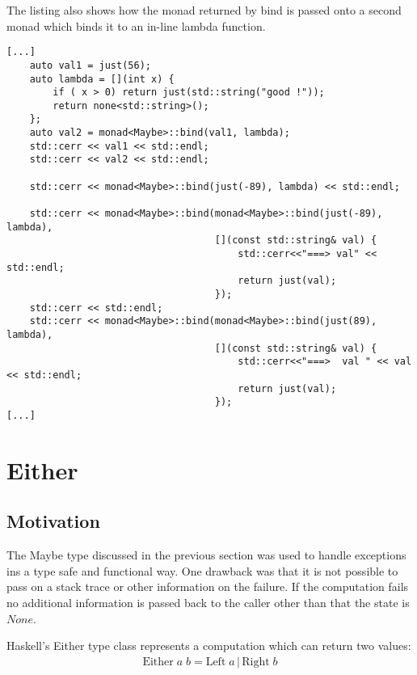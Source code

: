 \documentclass[12pt,fleqn]{article}
\begin{document}
The listing also shows how the monad returned by bind is passed onto a second monad which binds it to an in-line lambda function.

%
%
\begin{minipage}{\linewidth}
\begin{lstlisting}[caption=Maybe monad example, label=maybemonadexample]
[...]
	auto val1 = just(56);
	auto lambda = [](int x) {
		if ( x > 0) return just(std::string("good !"));
		return none<std::string>();
	};
	auto val2 = monad<Maybe>::bind(val1, lambda);
	std::cerr << val1 << std::endl;
	std::cerr << val2 << std::endl;

	std::cerr << monad<Maybe>::bind(just(-89), lambda) << std::endl;

	std::cerr << monad<Maybe>::bind(monad<Maybe>::bind(just(-89), lambda),
									[](const std::string& val) {
										std::cerr<<"===> val" << std::endl;
										return just(val);
									});
	std::cerr << std::endl;
	std::cerr << monad<Maybe>::bind(monad<Maybe>::bind(just(89), lambda),
									[](const std::string& val) {
										std::cerr<<"===>  val " << val << std::endl;
										return just(val);
									});
[...]
\end{lstlisting}
\end{minipage}
%
%
%


\section{Either}
%
%
%

\subsection{Motivation}
%
%

The Maybe type discussed in the previous section was used to handle exceptions ins a type safe and functional way.
One drawback was that it is not possible to pass on a stack trace or other information on the failure.  
If the computation fails no additional information is passed back to the caller other than that the state is $None$.

Haskell's Either type class represents a computation which can return two values:
\begin{eqnarray*}
\mbox {Either} \; a \; b = \mbox{Left} \; a \, | \, \mbox{Right} \; b
\end{eqnarray*}
\end{document}
